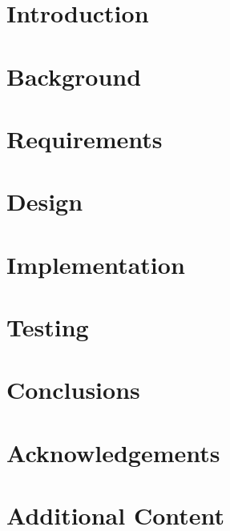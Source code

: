 \documentclass[12pt, twoside]{report}
\begin{document}
  

  \newpage
  \thispagestyle{empty}
  \mbox{}
  \newpage

  \setcounter{page}{1}
  

  \clearpage
    \printglossaries

  \tableofcontents

  \chapter{Introduction} \label{introduction}
    

  \chapter{Background} \label{background}
    

  \chapter{Requirements} \label{requirements}
    

  \chapter{Design} \label{design}
    

  \chapter{Implementation} \label{implementation}
    

  \chapter{Testing} \label{testing}
    

  \chapter{Conclusions} \label{conclusions}
    

  \chapter*{Acknowledgements} \label{acknowledgements}
    

  \appendix

  \chapter{Additional Content} \label{additional}
    

  \clearpage
    
\end{document}

